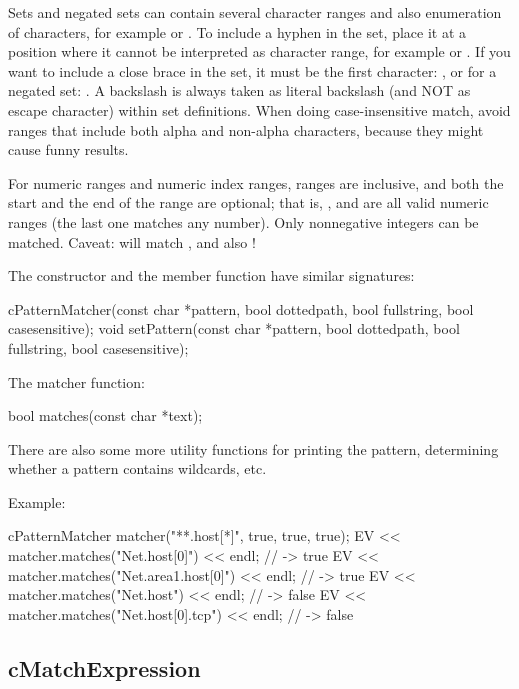 Sets and negated sets can contain several character ranges and also
enumeration of characters, for example  or
. To include a hyphen in the set, place it at a position
where it cannot be interpreted as character range, for example
 or . If you want to include a close brace in
the set, it must be the first character: , or for a negated
set: . A backslash is always taken as
literal backslash (and NOT as escape character) within set definitions.
When doing case-insensitive match, avoid ranges that include both alpha and
non-alpha characters, because they might cause funny results.

For numeric ranges and numeric index ranges, ranges are inclusive, and both
the start and the end of the range are optional; that is, ,
 and  are all valid numeric ranges (the last one
matches any number). Only nonnegative integers can be matched. Caveat:
 will match ,  and also !

The  constructor and the  member
function have similar signatures:

\begin{cpp}
cPatternMatcher(const char *pattern, bool dottedpath, bool fullstring,
                bool casesensitive);
void setPattern(const char *pattern, bool dottedpath, bool fullstring,
                bool casesensitive);
\end{cpp}

The matcher function:

\begin{cpp}
bool matches(const char *text);
\end{cpp}

There are also some more utility functions for printing the pattern,
determining whether a pattern contains wildcards, etc.

Example:

\begin{cpp}
cPatternMatcher matcher("**.host[*]", true, true, true);
EV << matcher.matches("Net.host[0]") << endl;  // -> true
EV << matcher.matches("Net.area1.host[0]") << endl;  // -> true
EV << matcher.matches("Net.host") << endl;  // -> false
EV << matcher.matches("Net.host[0].tcp") << endl;  // -> false
\end{cpp}


\subsection{cMatchExpression}
\label{sec:sim-lib:cmatchexpression}

